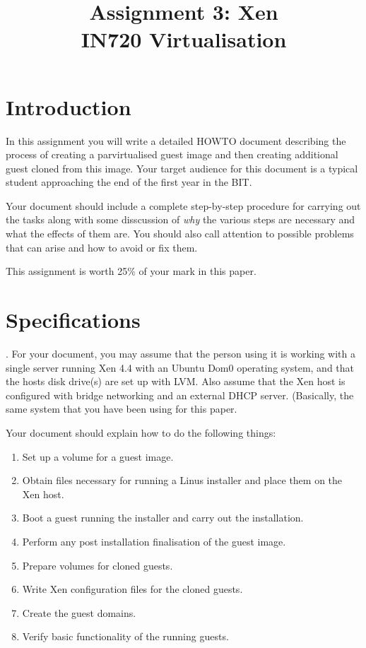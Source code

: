 \documentclass{article}
\begin{document}
\title{Assignment 3: Xen \\ IN720 Virtualisation}
\date{}
\maketitle

\section*{Introduction}
In this assignment you will write a detailed HOWTO document describing the process of creating a parvirtualised
guest image and then creating additional guest cloned from this image. Your target audience for this document is
a typical student approaching the end of the first year in the BIT.

Your document should include a complete step-by-step procedure for carrying out the tasks along with some disscussion
of \emph{why} the various steps are necessary and what the effects of them are. You should also call attention to 
possible problems that can arise and how to avoid or fix them.

This assignment is worth 25\% of your mark in this paper.

\section{Specifications}
.
For your document, you may assume that the person using it is working with a single server running Xen 4.4 with an 
Ubuntu Dom0 operating system, and that the hosts disk drive(s) are set up with LVM. Also assume that the Xen host
is configured with bridge networking and an external DHCP server. (Basically, the same system that you have been using for this paper.

Your document should explain how to do the following things:

\begin{enumerate}
	\item Set up a volume for a guest image.
	\item Obtain files necessary for running a Linus installer and place them on the Xen host.
	\item Boot a guest running the installer and carry out the installation.
	\item Perform any post installation finalisation of the guest image.
	\item Prepare volumes for cloned guests.
	\item Write Xen configuration files for the cloned guests.
	\item Create the guest domains.
	\item Verify basic functionality of the running guests.
\end{enumerate}
\end{document}
